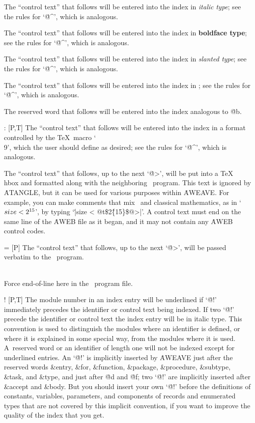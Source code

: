 \@i [P,T] The ``control text'' that follows will be entered into the index
in {\it italic type\/}; see the rules for `\.{@\^}', which is analogous.

\@b [P,T] The ``control text'' that follows will be entered into the index
in {\bf boldface type}; see the rules for `\.{@\^}', which is analogous.

\@s [P,T] The ``control text'' that follows will be entered into the index
in {\sl slanted type\/}; see the rules for `\.{@\^}', which is analogous.  

\@p [P,T] The ``control text'' that follows will be entered into the index
in  ; see the rules for `\.{@\^}', which is analogous.

\@r [P,T] The reserved word that follows will be entered into the index
analogous to \.{@b}.

\@: [P,T] The ``control text'' that follows will be entered into the index
in a format controlled by the \TeX\ macro `\.{\\9}', which the user
should define as desired; see the rules for `\.{@\^}', which is analogous.
 
\@t [P] The ``control text'' that follows, up to the next `\.{@>}', will
be put into a \TeX\ \.{\\hbox} and formatted along with the neighboring
\ADA\ program. This text is ignored by \.{ATANGLE}, but it can be used
for various purposes within \.{AWEAVE}. For example, you can make comments
that mix \ADA\ and classical mathematics, as in `$\\{size}<2^{15}$', by
typing `\.{|size < @t\$2\^\{15\}\$@>|}'.  A control text must end on the
same line of the \.{AWEB} file as it began, and it may not contain any
\.{AWEB} control codes.
 
\@= [P] The ``control text'' that follows, up to the next `\.{@>}', will
be passed verbatim to the \ADA\ program.
 
\@\\ [P] Force end-of-line here in the \ADA\ program file.
 
\@! [P,T] The module number in an index entry will be underlined if `\.{@!}'
immediately precedes the identifier or control text being indexed. If 
two `\.{@!}' precede the identifier or control text the index entry will be 
in italic type. This convention is used to distinguish the modules where an 
identifier is defined, or where it is explained in some special way, from 
the modules where it is used. A~reserved word or an identifier of length one 
will not be indexed except for underlined entries. An `\.{@!}' is implicitly 
inserted by \.{AWEAVE} just after the reserved words \&{entry}, \&{for},
\&{function}, \&{package}, \&{procedure}, \&{subtype}, \&{task}, and 
\&{type}, and just after \.{@d} and \.{@f}; two `\.{@!}' are implicitly
inserted after \&{accept} and \&{body}. But you should insert your own 
`\.{@!}' before the definitions of constants, variables, parameters, and 
components of records and enumerated types that are not covered by this 
implicit convention, if you want to improve the quality of the index that 
you get.
 

